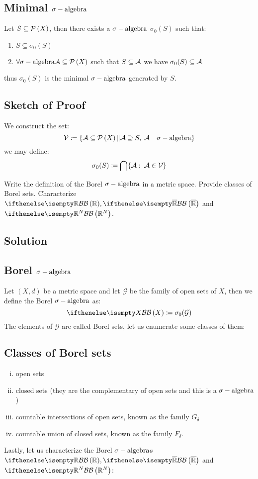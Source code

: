 \subsection{Minimal \texorpdfstring{$\sigma-\text{algebra}$}{sigma-algebra}}
Let $S\subseteq\mathcal{P}\left(X\right)$, then there exists a $\sigma-\text{algebra}$ $\sigma_0(S)$ such that:\\
\begin{enumerate}
    \item $S\subseteq \sigma_0(S)$
    \item $\forall \sigma-\text{algebra} \mathcal{A}\subseteq\mathcal{P}\left(X\right)$ such that $S\subseteq\mathcal{A}$ we have $\sigma_0(S) \subseteq\mathcal{A}$
\end{enumerate}
thus $\sigma_0(S)$ is the minimal $\sigma-\text{algebra}$ generated by $S$.\\

\subsection*{Sketch of Proof}
We construct the set:
\[
    \mathcal{V} \coloneqq \{\mathcal{A} \subseteq \mathcal{P}\left(X\right) \| \mathcal{A} \supseteq S, \; \mathcal{A} \quad \sigma-\text{algebra} \}    
\]
we may define:
\[
    \sigma_0(S)\coloneqq \bigcap \{\mathcal{A}: \: \mathcal{A}\in\mathcal{V}\}    
\]

\question
Write the definition of the Borel $\sigma-\text{algebra}$ in a metric space. Provide classes of Borel sets.
Characterize $\B[\R], \B[\Rcomp]$ and $\B[\R^N]$.

\subsection*{Solution}

\subsection{Borel \texorpdfstring{$\sigma-\text{algebra}$}{sigma-algebra}}
Let $(X,d)$ be a metric space and let $\mathcal{G}$ be the family of open sets of $X$, then we define the Borel $\sigma-\text{algebra}$ as:
\[
    \B[X] \coloneqq \sigma_0(\mathcal{G})    
\]
The elements of $\mathcal{G}$ are called Borel sets,   let us enumerate some classes of them:

\subsection{Classes of Borel sets} 
\begin{enumerate}[i)]
    \item open sets
    \item closed sets (they are the complementary of open sets and this is a $\sigma-\text{algebra}$)
    \item countable intersections of open sets, known as the family $G_\delta$
    \item countable union of closed sets, known as the family $F_\delta$.
\end{enumerate} 
Lastly, let us characterize the Borel $\sigma-\text{algebra}$s $\B[\R],\B[\Rcomp]$ and $\B[\R^N]$:
